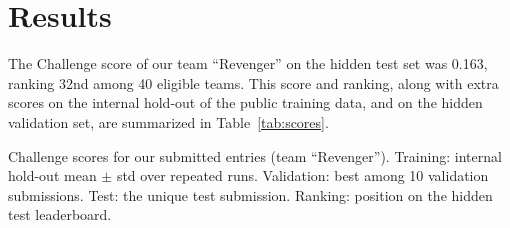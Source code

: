 \section{Results}
\label{sec:results}


The Challenge score of our team ``Revenger'' on the hidden test set was 0.163, ranking 32nd among 40 eligible teams. This score and ranking, along with extra scores on the internal hold-out of the public training data, and on the hidden validation set, are summarized in Table~\ref{tab:scores}.

\begin{table}[!htp]
\centering
% 

\caption{Challenge scores for our submitted entries (team ``Revenger''). Training: internal hold-out mean $\pm$ std over repeated runs. Validation: best among 10 validation submissions. Test: the unique test submission. Ranking: position on the hidden test leaderboard.}
\label{tab:scores}
\end{table}
